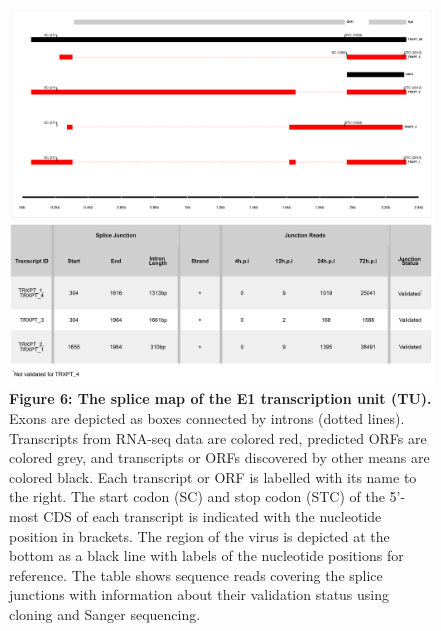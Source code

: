 \documentclass[
]{article}
\begin{document}
\begin{figure}
\centering
\includegraphics{results/r/figures/figure_6.png}
\caption{\textbf{Figure 6: The splice map of the E1 transcription unit
(TU).} Exons are depicted as boxes connected by introns (dotted lines).
Transcripts from RNA-seq data are colored red, predicted ORFs are
colored grey, and transcripts or ORFs discovered by other means are
colored black. Each transcript or ORF is labelled with its name to the
right. The start codon (SC) and stop codon (STC) of the 5'-most CDS of
each transcript is indicated with the nucleotide position in brackets.
The region of the virus is depicted at the bottom as a black line with
labels of the nucleotide positions for reference. The table shows
sequence reads covering the splice junctions with information about
their validation status using cloning and Sanger sequencing.}
\end{figure}
\end{document}
